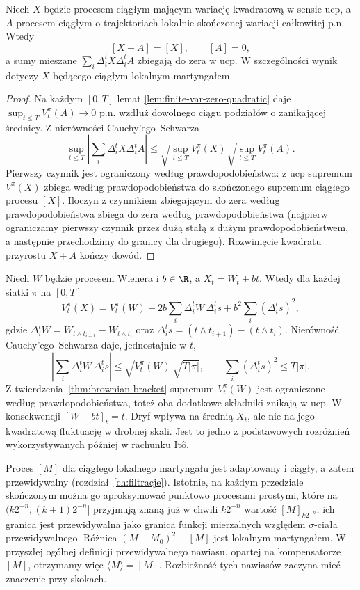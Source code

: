 \begin{twierdzenie}
\label{thm:finite-var-drift-bracket}
Niech $X$ będzie procesem ciągłym mającym
wariację kwadratową w sensie ucp, a $A$
procesem ciągłym o trajektoriach lokalnie
skończonej wariacji całkowitej p.n.
Wtedy
\[
[X+A]=[X],\qquad [A]=0,
\]
a sumy mieszane $\sum_i\Delta_i^tX\Delta_i^tA$
zbiegają do zera w ucp. W szczególności wynik
dotyczy $X$ będącego ciągłym lokalnym martyngałem.
\end{twierdzenie}
\begin{proof}
Na każdym $[0,T]$ lemat
\ref{lem:finite-var-zero-quadratic} daje
$\sup_{t\le T}V_t^\pi(A)\to0$ p.n. wzdłuż
dowolnego ciągu podziałów o zanikającej średnicy.
Z nierówności Cauchy'ego--Schwarza
\[
\sup_{t\le T}\left|\sum_i\Delta_i^tX\Delta_i^tA\right|
\le
\sqrt{\sup_{t\le T}V_t^\pi(X)}
\sqrt{\sup_{t\le T}V_t^\pi(A)}.
\]
Pierwszy czynnik jest ograniczony według
prawdopodobieństwa: z ucp supremum $V^\pi(X)$
zbiega według prawdopodobieństwa do skończonego
supremum ciągłego procesu $[X]$.
Iloczyn z czynnikiem zbiegającym do zera
według prawdopodobieństwa zbiega do zera
według prawdopodobieństwa (najpierw ograniczamy
pierwszy czynnik przez dużą stałą z dużym
prawdopodobieństwem, a następnie przechodzimy
do granicy dla drugiego).
Rozwinięcie kwadratu przyrostu $X+A$ kończy dowód.
\end{proof}

\begin{przyklad}
Niech $W$ będzie procesem Wienera i $b\in\R$, a
$X_t=W_t+bt$. Wtedy dla każdej siatki $\pi$ na $[0,T]$
\[
V_t^\pi(X)=V_t^\pi(W)
 +2b\sum_i\Delta_i^tW\,\Delta_i^t s
 +b^2\sum_i(\Delta_i^t s)^2,
\]
gdzie $\Delta_i^tW=W_{t\wedge t_{i+1}}-W_{t\wedge t_i}$
oraz $\Delta_i^t s=(t\wedge t_{i+1})-(t\wedge t_i)$.
Nierówność Cauchy'ego--Schwarza daje, jednostajnie w $t$,
\[
\left|\sum_i\Delta_i^tW\,\Delta_i^t s\right|
\le \sqrt{V_t^\pi(W)}\,\sqrt{T|\pi|},\qquad
\sum_i(\Delta_i^t s)^2\le T|\pi|.
\]
Z twierdzenia~\ref{thm:brownian-bracket} supremum $V_t^\pi(W)$
jest ograniczone według prawdopodobieństwa, toteż oba dodatkowe
składniki znikają w ucp. W konsekwencji $[W+bt]_t=t$.
Dryf wpływa na średnią $X_t$, ale nie na jego kwadratową
fluktuację w drobnej skali. Jest to jedno z podstawowych
rozróżnień wykorzystywanych później w rachunku It\^o.
\end{przyklad}

\begin{uwaga}
Proces $[M]$ dla ciągłego lokalnego martyngału jest adaptowany
i ciągły, a zatem przewidywalny (rozdział~\ref{ch:filtracje}). Istotnie, na każdym przedziale
skończonym można go aproksymować punktowo procesami prostymi,
które na $(k2^{-n},(k+1)2^{-n}]$ przyjmują znaną już w chwili
$k2^{-n}$ wartość $[M]_{k2^{-n}}$; ich granica jest
przewidywalna jako granica funkcji mierzalnych względem
$\sigma$-ciała przewidywalnego. Różnica $(M-M_0)^2-[M]$
jest lokalnym martyngałem. W przyszłej ogólnej definicji
przewidywalnego nawiasu, opartej na kompensatorze $[M]$,
otrzymamy więc $\langle M\rangle=[M]$.
Rozbieżność tych nawiasów zaczyna mieć znaczenie przy skokach.
\end{uwaga}


